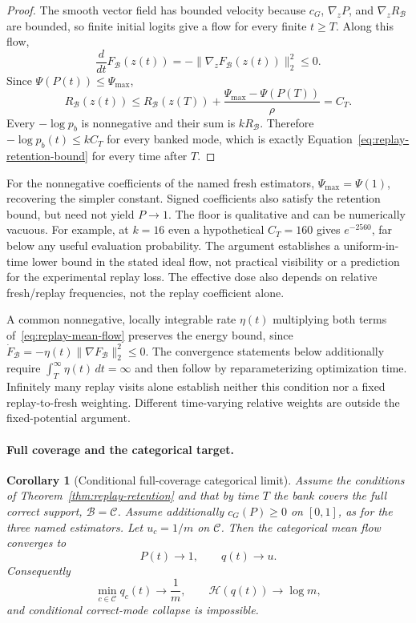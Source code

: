 \documentclass{article}
\newcommand{\enforcehalffinalproseline}{%
  \setlength{\parfillskip}{0pt plus .20\linewidth}}
\newcommand{\1}{\mathbf 1}
\newtheorem{corollary}[lemma]{Corollary}
\theoremstyle{remark}
\theoremstyle{definition}
\theoremstyle{plain}
\begin{document}
\begin{proof}
\enforcehalffinalproseline
The smooth vector field has bounded velocity because $c_G$,
$\nabla_zP$, and $\nabla_zR_{\mathcal B}$ are bounded, so finite initial
logits give a flow for every finite $t\ge T$. Along this flow,
\[
  \frac{d}{dt}F_{\mathcal B}(z(t))
  =-\lVert\nabla_zF_{\mathcal B}(z(t))\rVert_2^2\le0.
\]
Since $\Psi(P(t))\le\Psi_{\max}$,
\[
  R_{\mathcal B}(z(t))
  \le R_{\mathcal B}(z(T))
     +\frac{\Psi_{\max}-\Psi(P(T))}{\rho}
  =C_T.
\]
Every $-\log p_b$ is nonnegative and their sum is
$kR_{\mathcal B}$. Therefore
$-\log p_b(t)\le kC_T$ for every banked mode, which is exactly
Equation~\eqref{eq:replay-retention-bound} for every time after $T$.
\end{proof}


For the nonnegative coefficients of the named fresh estimators,
$\Psi_{\max}=\Psi(1)$, recovering the simpler constant. Signed coefficients
also satisfy the retention bound, but need not yield $P\to1$.
The floor is qualitative and can be numerically vacuous. For example, at
$k=16$ even a hypothetical $C_T=160$ gives $e^{-2560}$, far below any useful
evaluation probability. The argument establishes a uniform-in-time lower
bound in the stated ideal flow, not practical visibility or a prediction for
the experimental replay loss. The effective dose also depends on relative
fresh/replay frequencies, not the replay coefficient alone.

A common nonnegative, locally integrable rate $\eta(t)$ multiplying both
terms of~\eqref{eq:replay-mean-flow} preserves the energy bound, since
$\dot F_{\mathcal B}=-\eta(t)\|\nabla F_{\mathcal B}\|_2^2\le0$.
The convergence statements below additionally require
$\int_T^\infty\eta(t)\,dt=\infty$ and then follow by reparameterizing
optimization time. Infinitely many replay visits alone establish neither
this condition nor a fixed replay-to-fresh weighting. Different time-varying
relative weights are outside the fixed-potential argument.

\paragraph{Full coverage and the categorical target.}
\begin{corollary}[Conditional full-coverage categorical limit]
\enforcehalffinalproseline
\label{cor:replay-no-collapse}
Assume the conditions of Theorem~\ref{thm:replay-retention} and that by time
$T$ the bank covers the full correct support, $\mathcal B=\mathcal C$.
Assume additionally $c_G(P)\ge0$ on $[0,1]$, as for the three named
estimators. Let
$u_c=1/m$ on $\mathcal C$. Then the categorical mean flow converges to
\[
  P(t)\longrightarrow1,
  \qquad q(t)\longrightarrow u.
\]
Consequently
\[
  \min_{c\in\mathcal C}q_c(t)\longrightarrow\frac1m,
  \qquad
  \mathcal H(q(t))\longrightarrow\log m,
\]
and conditional correct-mode collapse is impossible.
\end{corollary}
\end{document}
